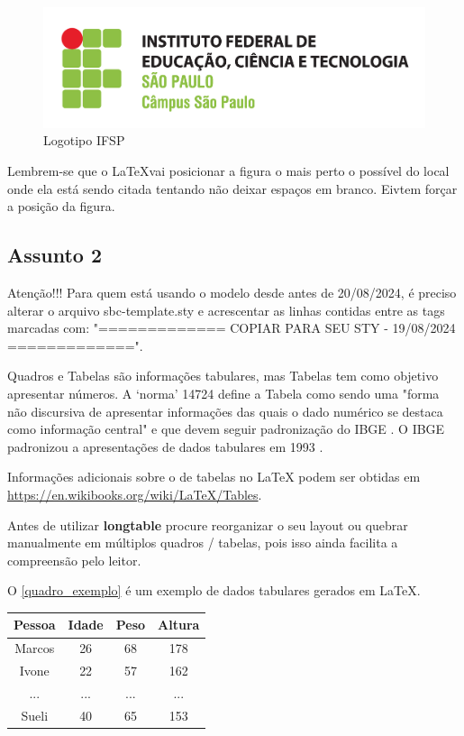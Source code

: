 \documentclass[
	article,			%
	12pt,				%
	oneside,			%
	a4paper,			%
    BIBLATEX,           %
	english,			%
	brazil,				%
	sumario=tradicional
	]{abntex2}
\begin{document}
\begin{figure}[htb]
    \centering
	\caption{\label{fig_logo}Logotipo IFSP}
	\includegraphics{Figuras/logoIFSP.jpg}
\end{figure}

Lembrem-se que o \LaTeX vai posicionar a figura o mais perto o possível do local onde ela está sendo citada tentando não deixar espaços em branco. Eivtem forçar a posição da figura.


\subsection{Assunto 2}

Atenção!!! Para quem está usando o modelo desde antes de 20/08/2024, é preciso
alterar o arquivo sbc-template.sty e acrescentar as linhas contidas entre as tags marcadas com: "============= COPIAR PARA SEU STY - 19/08/2024 =============".

Quadros e Tabelas são informações tabulares, mas Tabelas tem como objetivo apresentar números. A ‘norma’ 14724 \cite{NBR14724:2011} define a Tabela como sendo uma "forma não discursiva de apresentar informações das quais o dado numérico se destaca como informação central" e que devem seguir padronização do IBGE \cite{NBR14724:2011}. O IBGE padronizou a apresentações de dados tabulares em 1993 \cite{tabular-ibge}.

Informações adicionais sobre o de tabelas no {\LaTeX} podem ser obtidas em  \url{https://en.wikibooks.org/wiki/LaTeX/Tables}.

Antes de utilizar \textbf{longtable} procure reorganizar o seu layout ou quebrar manualmente em múltiplos quadros / tabelas, pois isso ainda facilita a compreensão pelo leitor.


O \autoref{quadro_exemplo} é um exemplo de dados tabulares gerados em \LaTeX.

\begin{quadro}[htb]
\caption{\label{quadro_exemplo}Exemplo de quadro}
\begin{tabular}{|c|c|c|c|}
	\hline
	\textbf{Pessoa} & \textbf{Idade} & \textbf{Peso} & \textbf{Altura} \\ \hline
	Marcos & 26    & 68   & 178    \\ \hline
	Ivone  & 22    & 57   & 162    \\ \hline
	...    & ...   & ...  & ...    \\ \hline
	Sueli  & 40    & 65   & 153    \\ \hline
\end{tabular}
\end{quadro}
\end{document}
